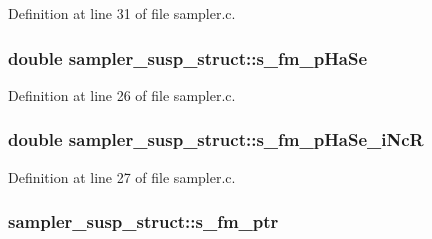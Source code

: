 Definition at line 31 of file sampler.\+c.

\subsubsection[{\texorpdfstring{s\+\_\+fm\+\_\+p\+Ha\+Se}{s_fm_pHaSe}}]{\setlength{\rightskip}{0pt plus 5cm}double sampler\+\_\+susp\+\_\+struct\+::s\+\_\+fm\+\_\+p\+Ha\+Se}\hypertarget{structsampler__susp__struct_a4ac06bd5c8cd4672504ee0fc42138e99}{}\label{structsampler__susp__struct_a4ac06bd5c8cd4672504ee0fc42138e99}


Definition at line 26 of file sampler.\+c.

\subsubsection[{\texorpdfstring{s\+\_\+fm\+\_\+p\+Ha\+Se\+\_\+i\+NcR}{s_fm_pHaSe_iNcR}}]{\setlength{\rightskip}{0pt plus 5cm}double sampler\+\_\+susp\+\_\+struct\+::s\+\_\+fm\+\_\+p\+Ha\+Se\+\_\+i\+NcR}\hypertarget{structsampler__susp__struct_a81be99f2c9ff04d8408e018b3bea55f8}{}\label{structsampler__susp__struct_a81be99f2c9ff04d8408e018b3bea55f8}


Definition at line 27 of file sampler.\+c.

\subsubsection[{\texorpdfstring{s\+\_\+fm\+\_\+ptr}{s_fm_ptr}}]{ sampler\+\_\+susp\+\_\+struct\+::s\+\_\+fm\+\_\+ptr}\hypertarget{structsampler__susp__struct_a0c1d7b5cf865835b5ba13cf6cd719864}{}\label{structsampler__susp__struct_a0c1d7b5cf865835b5ba13cf6cd719864}


